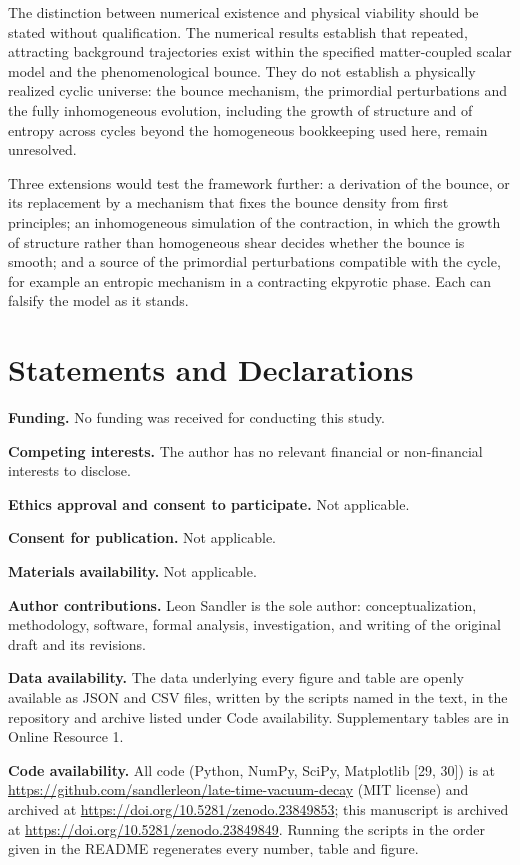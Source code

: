 \documentclass[11pt,a4paper]{article}
\begin{document}
The distinction between numerical existence and physical viability should be stated without qualification. The numerical results establish that repeated, attracting background trajectories exist within the specified matter-coupled scalar model and the phenomenological bounce. They do not establish a physically realized cyclic universe: the bounce mechanism, the primordial perturbations and the fully inhomogeneous evolution, including the growth of structure and of entropy across cycles beyond the homogeneous bookkeeping used here, remain unresolved.

Three extensions would test the framework further: a derivation of the bounce, or its replacement by a mechanism that fixes the bounce density from first principles; an inhomogeneous simulation of the contraction, in which the growth of structure rather than homogeneous shear decides whether the bounce is smooth; and a source of the primordial perturbations compatible with the cycle, for example an entropic mechanism in a contracting ekpyrotic phase. Each can falsify the model as it stands.

\section*{Statements and Declarations}
\noindent\textbf{Funding.} No funding was received for conducting this study.

\noindent\textbf{Competing interests.} The author has no relevant financial or non-financial interests to disclose.

\noindent\textbf{Ethics approval and consent to participate.} Not applicable.

\noindent\textbf{Consent for publication.} Not applicable.

\noindent\textbf{Materials availability.} Not applicable.

\noindent\textbf{Author contributions.} Leon Sandler is the sole author: conceptualization, methodology, software, formal analysis, investigation, and writing of the original draft and its revisions.

\noindent\textbf{Data availability.} The data underlying every figure and table are openly available as JSON and CSV files, written by the scripts named in the text, in the repository and archive listed under Code availability. Supplementary tables are in Online Resource 1.

\noindent\textbf{Code availability.} All code (Python, NumPy, SciPy, Matplotlib [29, 30]) is at \url{https://github.com/sandlerleon/late-time-vacuum-decay} (MIT license) and archived at \url{https://doi.org/10.5281/zenodo.23849853}; this manuscript is archived at \url{https://doi.org/10.5281/zenodo.23849849}. Running the scripts in the order given in the README regenerates every number, table and figure.
\end{document}
